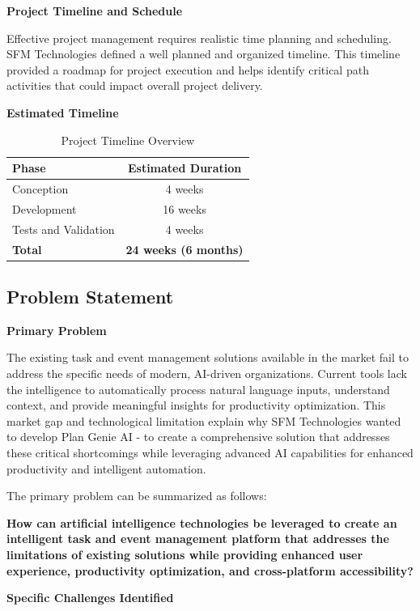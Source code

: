 \documentclass[12pt,a4paper]{article}
\begin{document}
\textbf{Project Timeline and Schedule}

Effective project management requires realistic time planning and scheduling. SFM Technologies defined a well planned and organized timeline. This timeline provided a roadmap for project execution and helps identify critical path activities that could impact overall project delivery.

\textbf{Estimated Timeline}
\begin{table}[H]
\centering
\begin{tabular}{|l|c|}
\hline
\textbf{Phase} & \textbf{Estimated Duration} \\
\hline
Conception & 4 weeks \\
\hline
Development & 16 weeks \\
\hline
Tests and Validation & 4 weeks \\
\hline
\textbf{Total} & \textbf{24 weeks (6 months)} \\
\hline
\end{tabular}
\caption{Project Timeline Overview}
\end{table}


\subsection{Problem Statement}

\textbf{Primary Problem}

The existing task and event management solutions available in the market fail to address the specific needs of modern, AI-driven organizations. Current tools lack the intelligence to automatically process natural language inputs, understand context, and provide meaningful insights for productivity optimization. This market gap and technological limitation explain why SFM Technologies wanted to develop Plan Genie AI - to create a comprehensive solution that addresses these critical shortcomings while leveraging advanced AI capabilities for enhanced productivity and intelligent automation.

The primary problem can be summarized as follows:

\textbf{How can artificial intelligence technologies be leveraged to create an intelligent task and event management platform that addresses the limitations of existing solutions while providing enhanced user experience, productivity optimization, and cross-platform accessibility?}



\textbf{Specific Challenges Identified}
\end{document}
